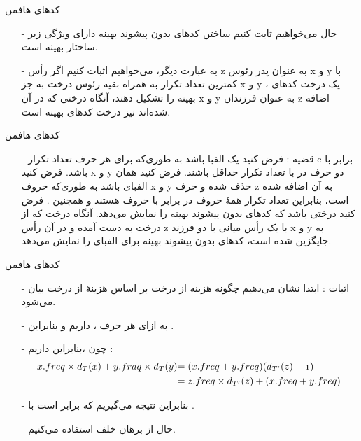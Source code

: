 \begin{frame}{‌کدهای هافمن}
\begin{itemize}\itemr
\item[-]
حال می‌خواهیم ثابت کنیم ساختن کدهای بدون پیشوند بهینه دارای ویژگی زیر ساختار بهینه است.
\item[-]
به عبارت دیگر، می‌خواهیم اثبات کنیم اگر رأس z به عنوان پدر رئوس x و y با کمترین تعداد تکرار به همراه بقیه رئوس درخت به جز x و y ، یک درخت کدهای بهینه را تشکیل دهند، آنگاه درختی که در آن x و y به عنوان فرزندان z اضافه شده‌اند نیز درخت کدهای بهینه است.
\end{itemize}
\end{frame}


\begin{frame}{‌کدهای هافمن}
\begin{itemize}\itemr
\item[-]
قضیه : فرض کنید
یک الفبا باشد به طوری‌که برای هر حرف
تعداد تکرار c برابر با
باشد. فرض کنید x و y دو حرف در
با تعداد تکرار حداقل باشند. فرض کنید
همان الفبای 
 باشد به طوری‌که حروف x و y حذف شده و حرف z به آن اضافه شده است، بنابراین
تعداد تکرار همهٔ حروف در
برابر با حروف
هستند و همچنین
.
فرض کنید
درختی باشد که کدهای بدون پیشوند بهینه
را نمایش می‌دهد. آنگاه درخت
که از درخت
به دست آمده و در آن رأس z با یک رأس میانی با دو فرزند x و y به جایگزین شده است، کدهای بدون پیشوند بهینه برای الفبای
را نمایش می‌دهد.
\end{itemize}
\end{frame}


\begin{frame}{‌کدهای هافمن}
\begin{itemize}\itemr
\item[-]
اثبات : ابتدا نشان می‌دهیم چگونه هزینه
از درخت
بر اساس هزینهٔ
از درخت
بیان می‌شود.
\item[-]
به ازای هر حرف
، داریم
و بنابراین
 .
\item[-]
چون
،بنابراین داریم :
\begin{align*}
\mathnormal{x.freq \times d_T(x) + y.fraq \times d_T(y)} & \mathnormal{= (x.freq + y.freq)(d_{T'}(z) + 1)}\\
& \mathnormal{= z.freq \times d_{T'}(z) + (x.freq + y.freq)}
\end{align*}
\item[-]
بنابراین نتیجه می‌گیریم
که برابر است با
.
\item[-]
حال از برهان خلف استفاده می‌کنیم.
\end{itemize}
\end{frame}


